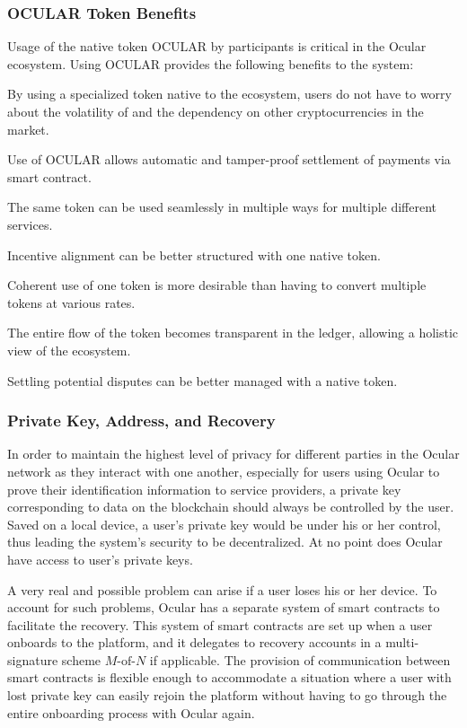 \documentclass[a4paper]{article}
\let\tempone\itemize
\let\temptwo\enditemize
\renewenvironment{itemize}{\tempone\addtolength{\itemsep}{-5pt}}{\temptwo}
\begin{document}
\subsubsection*{OCULAR Token Benefits}
Usage of the native token OCULAR by participants is critical in the Ocular ecosystem. Using OCULAR provides the following benefits to the system:
\begin{itemize}
\item By using a specialized token native to the ecosystem, users do not have to worry about the volatility of and the dependency on other cryptocurrencies in the market.
\item Use of OCULAR allows automatic and tamper-proof settlement of payments via smart contract.
\item The same token can be used seamlessly in multiple ways for multiple different services.
\item Incentive alignment can be better structured with one native token.
\item Coherent use of one token is more desirable than having to convert multiple tokens at various rates.
\item The entire flow of the token becomes transparent in the ledger, allowing a holistic view of the ecosystem.
\item Settling potential disputes can be better managed with a native token.
\end{itemize}

\subsubsection*{Private Key, Address, and Recovery}
In order to maintain the highest level of privacy for different parties in the Ocular network as they interact with one another, especially for users using Ocular to prove their identification information to service providers, a private key corresponding to data on the blockchain should always be controlled by the user. Saved on a local device, a user's private key would be under his or her control, thus leading the system's security to be decentralized. At no point does Ocular have access to user's private keys. 

A very real and possible problem can arise if a user loses his or her device. To account for such problems, Ocular has a separate system of smart contracts to facilitate the recovery. This system of smart contracts are set up when a user onboards to the platform, and it delegates to recovery accounts in a multi-signature scheme $M\text{-of-}N$ if applicable. The provision of communication between smart contracts is flexible enough to accommodate a situation where a user with lost private key can easily rejoin the platform without having to go through the entire onboarding process with Ocular again.
\end{document}
